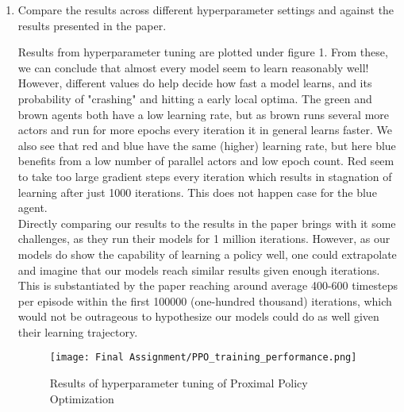 \documentclass{article}
\begin{document}
\begin{enumerate}
\item{Compare the results across different hyperparameter settings and against the results presented in the paper.}

Results from hyperparameter tuning are plotted under figure 1. From these, we can conclude that almost every model seem to learn reasonably well! However, different values do help decide how fast a model learns, and its probability of "crashing" and hitting a early local optima. The green and brown agents both have a low learning rate, but as brown runs several more actors and run for more epochs every iteration it in general learns faster. We also see that red and blue have the same (higher) learning rate, but here blue benefits from a low number of parallel actors and low epoch count. Red seem to take too large gradient steps every iteration which results in stagnation of learning after just 1000 iterations. This does not happen case for the blue agent.
\\[3pt]
Directly comparing our results to the results in the paper brings with it some challenges, as they run their models for 1 million iterations. However, as our models do show the capability of learning a policy well, one could extrapolate and imagine that our models reach similar results given enough iterations. This is substantiated by the paper reaching around average 400-600 timesteps per episode within the first 100000 (one-hundred thousand) iterations, which would not be outrageous to hypothesize our models could do as well given their learning trajectory.

\begin{figure}[b!]
    \centering
    \texttt{[image: Final Assignment/PPO\_training\_performance.png]}
    \caption{Results of hyperparameter tuning of Proximal Policy Optimization}
\end{figure}

\end{enumerate}
\end{document}
